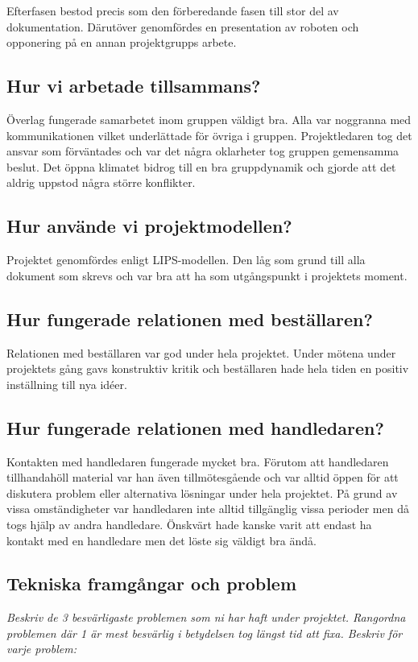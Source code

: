 \documentclass[11pt]{article}
\begin{document}
Efterfasen bestod precis som den förberedande fasen till stor del av dokumentation. Därutöver genomfördes en presentation av roboten och opponering på en annan projektgrupps arbete.

\subsection{Hur vi arbetade tillsammans?}
Överlag fungerade samarbetet inom gruppen väldigt bra. Alla var noggranna med kommunikationen vilket underlättade för övriga i gruppen. Projektledaren tog det ansvar som förväntades och var det några oklarheter tog gruppen gemensamma beslut. Det öppna klimatet bidrog till en bra gruppdynamik och gjorde att det aldrig uppstod några större konflikter.

\subsection{Hur använde vi projektmodellen?} 
Projektet genomfördes enligt LIPS-modellen. Den låg som grund till alla dokument som skrevs och var bra att ha som utgångspunkt i projektets moment. 

\subsection{Hur fungerade relationen med beställaren?}
Relationen med beställaren var god under hela projektet. Under mötena under projektets gång gavs konstruktiv kritik och beställaren hade hela tiden en positiv inställning till nya idéer. 

\subsection{Hur fungerade relationen med handledaren?}
Kontakten med handledaren fungerade mycket bra. Förutom att handledaren tillhandahöll material var han även  tillmötesgående och var alltid öppen för att diskutera problem eller alternativa lösningar under hela projektet. På grund av vissa omständigheter var handledaren inte alltid tillgänglig vissa perioder men då togs hjälp av andra handledare. Önskvärt hade kanske varit att endast ha kontakt med en handledare men det löste sig väldigt bra ändå.

\subsection{Tekniska framgångar och problem}
\textit{Beskriv de 3 besvärligaste problemen som ni har haft under projektet. Rangordna problemen där 1 är mest besvärlig i betydelsen tog längst tid att fixa. Beskriv för varje problem: }
\end{document}
